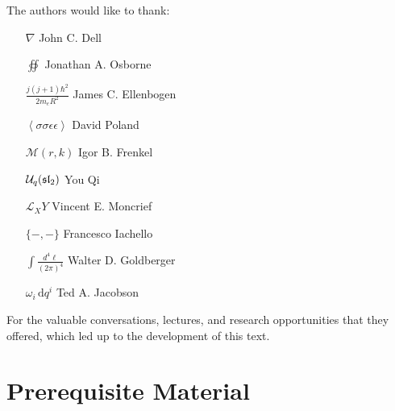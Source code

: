 \documentclass[12pt, twoside, openany]{book}
\begin{document}
\begin{large}
	The authors would like to thank:
	\vspace{.5cm}
	\begin{center}
	\begin{varwidth}{\textwidth}
			\begin{itemize} 
				\renewcommand\labelitemi{$\square$}
				\setlength\itemsep{.2em}
				\item[$\nabla$] John C. Dell
				\item[$\oiint$] Jonathan A. Osborne
				\item[$\frac{j(j+1)\hbar^2}{2 m_e R^2}$] James C. Ellenbogen
				\item[$\left< \sigma \sigma \epsilon \epsilon \right>$] David Poland
				\item[$\mathcal M(r, k)$] Igor B. Frenkel
				\item[$\mathcal U_q (\frak{sl}_2)$] You Qi
				\item[$\mathcal L_X Y$] Vincent E. Moncrief
				\item[$\{-,- \}$] Francesco Iachello
				\item[$\int \frac{d^4 \ell}{(2\pi)^4}$] Walter D. Goldberger
				\item[$\omega_i \, \mathrm d q^i$] Ted A. Jacobson
			\end{itemize}
	\end{varwidth}
	\end{center}
	\vspace{.5cm}
	For the valuable conversations, lectures, and research opportunities that they offered, which led up to the development of this text.
	
\end{large}

\newpage

\setcounter{page}{1}

\part{Prerequisite Material}


\end{document}
